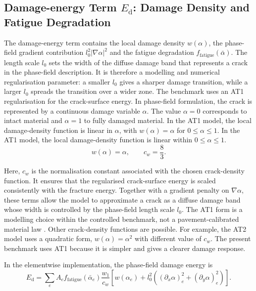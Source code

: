 \subsection{Damage-energy Term \texorpdfstring{$E_{\mathrm{d}}$}{Ed}: Damage Density and Fatigue Degradation}
\label{subsec:c3_phase_field_damage}

The damage-energy term contains the local damage density $w(\alpha)$, the phase-field gradient contribution $l_0^2|\nabla\alpha|^2$ and the fatigue degradation $f_{\mathrm{fatigue}}(\bar{\alpha})$. The length scale $l_0$ sets the width of the diffuse damage band that represents a crack in the phase-field description. It is therefore a modelling and numerical regularisation parameter: a smaller $l_0$ gives a sharper damage transition, while a larger $l_0$ spreads the transition over a wider zone. The benchmark uses an AT1 regularisation for the crack-surface energy. In phase-field formulation, the crack is represented by a continuous damage variable \(\alpha\). The value \(\alpha=0\) corresponds to intact material and \(\alpha=1\) to fully damaged material. In the AT1 model, the local damage-density function is linear in \(\alpha\), with \(w(\alpha)=\alpha\) for \(0 \le \alpha \le 1\). In the AT1 model, the local damage-density function is linear within \( 0 \le \alpha \le 1\).
\begin{equation}
    w(\alpha)=\alpha,
    \qquad
    c_w=\frac{8}{3}.
    \label{eq:c3_at1_damage_density}
\end{equation}


Here, \(c_w\) is the normalisation constant associated with the chosen crack-density function. It ensures that the regularised crack-surface energy is scaled consistently with the fracture energy. Together with a gradient penalty on \(\nabla\alpha\), these terms allow the model to approximate a crack as a diffuse damage band whose width is controlled by the phase-field length scale \(l_0\). The AT1 form is a modelling choice within the controlled benchmark, not a pavement-calibrated material law \citep{Pham2011ijdm}. Other crack-density functions are possible. For example, the AT2 model uses a quadratic form, \(w(\alpha)=\alpha^2\) with different value of \(c_w\). The present benchmark uses AT1 because it is simpler and gives a clearer damage response.


In the elementwise implementation, the phase-field damage energy is
\begin{equation}
    E_{\mathrm{d}}
    =
    \sum_e
    A_e
    f_{\mathrm{fatigue}}(\bar{\alpha}_e)
    \frac{w_1}{c_w}
    \left[
    w(\alpha_e)
    +
    l_0^2
    \left(
    (\partial_x\alpha)_e^2
    +
    (\partial_y\alpha)_e^2
    \right)
    \right].
    \label{eq:c3_damage_energy}
\end{equation}

